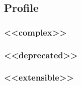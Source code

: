 \subsection{Profile} \label{sec:Profile}

\subsubsection{<<complex>>}
\label{sec:complex}





\FloatBarrier

\subsubsection{<<deprecated>>}
\label{sec:deprecated}





\FloatBarrier

\subsubsection{<<extensible>>}
\label{sec:extensible}





\FloatBarrier
